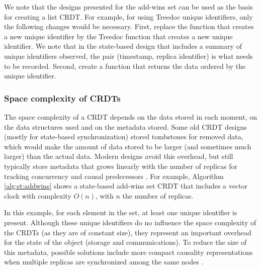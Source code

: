 \documentclass[11pt,a4paper]{article}
\begin{document}
We note that the designs presented for the add-wins set can be used as the basis
for creating a list CRDT. 
For example, for using Treedoc unique identifiers, only the following changes would 
be necessary.
First, replace the function that creates a new unique identifier by the Treedoc function 
that creates a new unique identifier.
We note that in the state-based design that includes a summary of unique identifiers 
observed, the pair (timestamp, replica identifier) is what needs to be recorded.
Second, create a function that returns the data ordered by the unique identifier.


%
%
%
%
%
%
%
\subsubsection{Space complexity of CRDTs}
The space complexity of a CRDT depends on the data stored in each moment, 
on the data structures used and on the metadata stored. 
Some old CRDT designs (mostly for state-based synchronization) stored tombstones 
for removed data, which would make the amount of data stored to be larger 
(and sometimes much larger) than the actual data. Modern designs avoid
this overhead, but still typically store metadata that grows linearly 
with the number of replicas  for tracking concurrency and causal 
predecessors \cite{DBLP:journals/ipl/Charron-Bost91}.
For example, Algorithm \ref{alg:st:addwins} shows a state-based add-wins
set CRDT that includes a vector clock with complexity $O(n)$, 
with $n$ the number of replicas.

In this example, for each element in the set, at least one unique identifier is
present.
Although these unique identifiers do no influence the space complexity of the 
CRDTs (as they are of constant size), they represent an important overhead 
for the state of the object (storage and communications). 
To reduce the size of this metadata, possible solutions include 
more compact causality representations when multiple replicas are 
synchronized among the same nodes 
\cite{DBLP:journals/dc/MalkhiT07,swiftcloud,DBLP:conf/srds/GoncalvesABF17,DBLP:journals/corr/AlmeidaB13}. 
\end{document}
